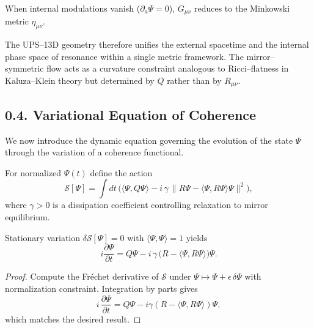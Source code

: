 \begin{corollary}
When internal modulations vanish ($\partial_a\Psi=0$), $G_{\mu\nu}$ reduces to the Minkowski metric $\eta_{\mu\nu}$.
\end{corollary}

\begin{remark}
The UPS–13D geometry therefore unifies the external spacetime and the internal phase space of resonance within a single metric framework.
The mirror–symmetric flow acts as a curvature constraint analogous to Ricci–flatness in Kaluza–Klein theory but determined by $Q$ rather than by $R_{\mu\nu}$.
\end{remark}

\subsection*{0.4. Variational Equation of Coherence}

\noindent
We now introduce the dynamic equation governing the evolution of the state $\Psi$ through the variation of a coherence functional.

\begin{definition}
For normalized $\Psi(t)$ define the action
\[
\mathcal{S}[\Psi]
= \int dt \, \Big(
   \langle \Psi, Q \Psi \rangle
   - i\,\gamma\, \| R\Psi - \langle \Psi, R\Psi\rangle \Psi \|^2
  \Big),
\]
where $\gamma > 0$ is a dissipation coefficient controlling relaxation to mirror equilibrium.
\end{definition}

\begin{theorem}
Stationary variation $\delta \mathcal{S}[\Psi]=0$ with $\langle\Psi,\Psi\rangle=1$ yields
\begin{equation}\label{eq:UPS}
i \frac{\partial \Psi}{\partial t}
 = Q\Psi
   - i\,\gamma\,\big(R - \langle \Psi,R\Psi\rangle \big)\Psi.
\end{equation}
\end{theorem}

\begin{proof}
Compute the Fréchet derivative of $\mathcal{S}$ under $\Psi \mapsto \Psi + \epsilon\,\delta\Psi$ with normalization constraint.
Integration by parts gives
\[
i\,\frac{\partial \Psi}{\partial t} = Q\Psi - i\gamma(R-\langle \Psi,R\Psi\rangle)\Psi,
\]
which matches the desired result.
\end{proof}

